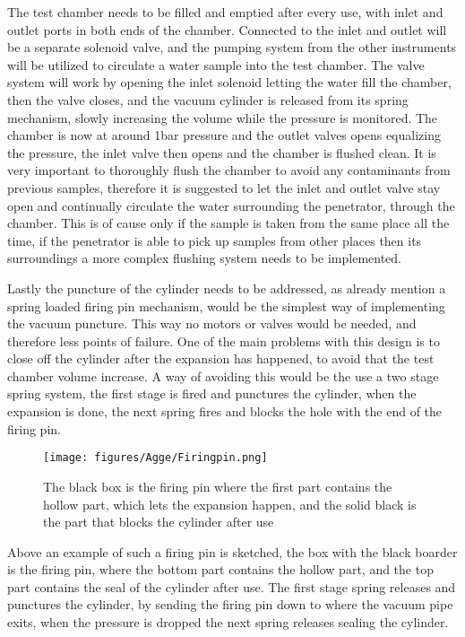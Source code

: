 \documentclass[10pt,a4paper,draft]{report}
\begin{document}
The test chamber needs to be filled and emptied after every use, with inlet and outlet ports in both ends of the chamber. Connected to the inlet and outlet will be a separate solenoid valve, and the pumping system from the other instruments will be utilized to circulate a water sample into the test chamber. The valve system will work by opening the inlet solenoid letting the water fill the chamber, then the valve closes, and the vacuum cylinder is released from its spring mechanism, slowly increasing the volume while the pressure is monitored. The chamber is now at around 1bar pressure and the outlet valves opens equalizing the pressure, the inlet valve then opens and the chamber is flushed clean. It is very important to thoroughly flush the chamber to avoid any contaminants from previous samples, therefore it is suggested to let the inlet and outlet valve stay open and continually circulate the water surrounding the penetrator, through the chamber. This is of cause only if the sample is taken from the same place all the time, if the penetrator is able to pick up samples from other places then its surroundings a more complex flushing system needs to be implemented.\par

Lastly the puncture of the cylinder needs to be addressed, as already mention a spring loaded firing pin mechanism, would be the simplest way of implementing the vacuum puncture. This way no motors or valves would be needed, and therefore less points of failure. One of the main problems with this design is to close off the cylinder after the expansion has happened, to avoid that the test chamber volume increase. A way of avoiding this would be the use a two stage spring system, the first stage is fired and punctures the cylinder, when the expansion is done, the next spring fires and blocks the hole with the end of the firing pin.\par

\begin{figure}[H]
\caption{The black box is the firing pin where the first part contains the hollow part, which lets the expansion happen, and the solid black is the part that blocks the cylinder after use}
\centering
\texttt{[image: figures/Agge/Firingpin.png]}    
\end{figure}


Above an example of such a firing pin is sketched, the box with the black boarder is the firing pin, where the bottom part contains the hollow part, and the top part contains the seal of the cylinder after use. The first stage spring releases and punctures the cylinder, by sending the firing pin down to where the vacuum pipe exits, when the pressure is dropped the next spring releases sealing the cylinder.\par
\end{document}
